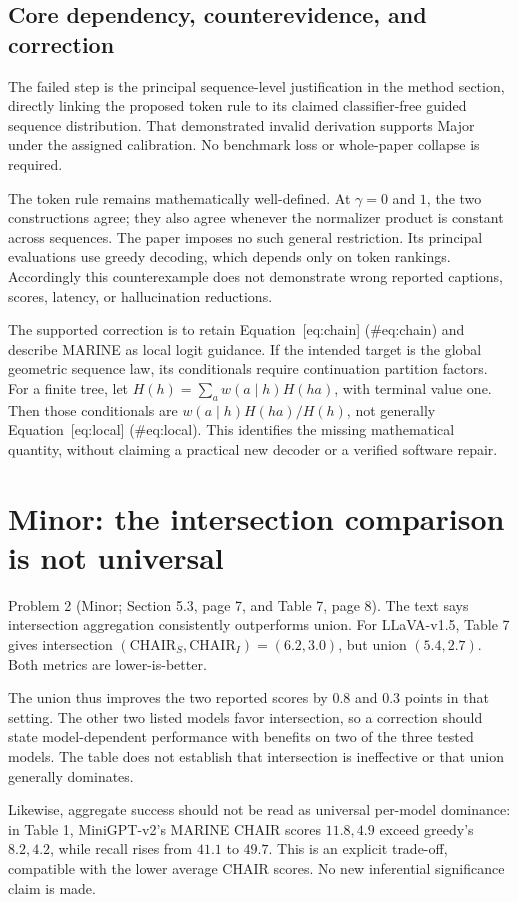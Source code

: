 \documentclass[10pt]{article}
\begin{document}
\subsection*{Core dependency, counterevidence, and correction}
The failed step is the principal sequence-level justification in the method section, directly linking the proposed token rule to its claimed classifier-free guided sequence distribution. That demonstrated invalid derivation supports Major under the assigned calibration. No benchmark loss or whole-paper collapse is required.\par
The token rule remains mathematically well-defined. At \(\gamma=0\) and \(1\), the two constructions agree; they also agree whenever the normalizer product is constant across sequences. The paper imposes no such general restriction. Its principal evaluations use greedy decoding, which depends only on token rankings. Accordingly this counterexample does not demonstrate wrong reported captions, scores, latency, or hallucination reductions.\par
The supported correction is to retain Equation [eq:chain] (\#eq:chain) and describe MARINE as local logit guidance. If the intended target is the global geometric sequence law, its conditionals require continuation partition factors. For a finite tree, let \(H(h)=\sum_a w(a\mid h)H(ha)\), with terminal value one. Then those conditionals are \(w(a\mid h)H(ha)/H(h)\), not generally Equation [eq:local] (\#eq:local). This identifies the missing mathematical quantity, without claiming a practical new decoder or a verified software repair.\par
\section*{Minor: the intersection comparison is not universal}
Problem 2 (Minor; Section 5.3, page 7, and Table 7, page 8).  The text says intersection aggregation consistently outperforms union. For LLaVA-v1.5, Table 7 gives intersection \((\mathrm{CHAIR}_S,\mathrm{CHAIR}_I)=(6.2,3.0)\), but union \((5.4,2.7)\). Both metrics are lower-is-better.\par
The union thus improves the two reported scores by \(0.8\) and \(0.3\) points in that setting. The other two listed models favor intersection, so a correction should state model-dependent performance with benefits on two of the three tested models. The table does not establish that intersection is ineffective or that union generally dominates.\par
Likewise, aggregate success should not be read as universal per-model dominance: in Table 1, MiniGPT-v2’s MARINE CHAIR scores \(11.8,4.9\) exceed greedy’s \(8.2,4.2\), while recall rises from \(41.1\) to \(49.7\). This is an explicit trade-off, compatible with the lower average CHAIR scores. No new inferential significance claim is made.\par
\end{document}
